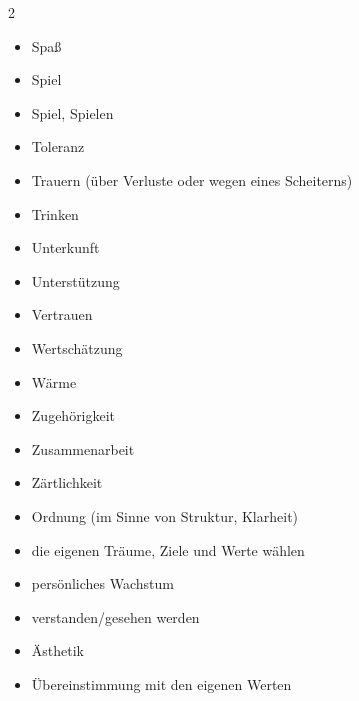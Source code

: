 \begin{multicols}{2}
\begin{itemize}
        \item Spaß
        \item Spiel
        \item Spiel, Spielen
        \item Toleranz
        \item Trauern (über Verluste oder wegen eines Scheiterns)
        \item Trinken
        \item Unterkunft
        \item Unterstützung
        \item Vertrauen
        \item Wertschätzung
        \item Wärme
        \item Zugehörigkeit
        \item Zusammenarbeit
        \item Zärtlichkeit
        \item \glqq Ordnung\grqq{} (im Sinne von Struktur, Klarheit)
        \item die eigenen Träume, Ziele und Werte wählen
        \item persönliches Wachstum
        \item verstanden/gesehen werden
        \item Ästhetik
        \item Übereinstimmung mit den eigenen Werten
    \end{itemize}
\end{multicols}
